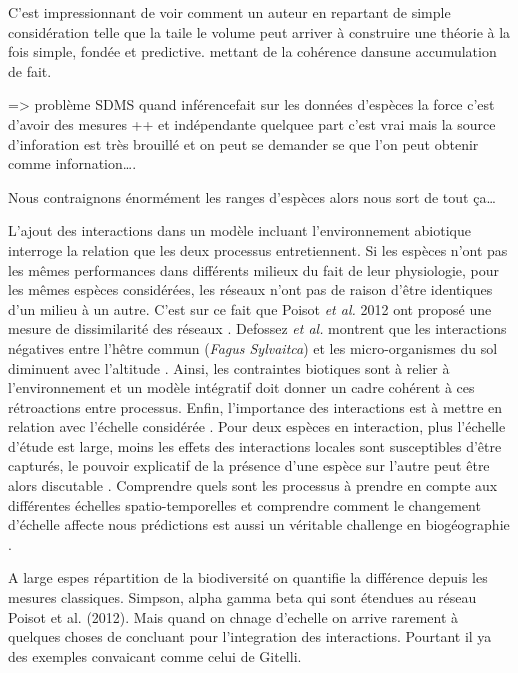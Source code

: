 C'est impressionnant de voir comment un auteur en repartant de simple
considération telle que la taile le volume peut arriver à construire une
théorie à la fois simple, fondée et predictive. mettant de la cohérence
dansune accumulation de fait.

=\textgreater{} problème SDMS quand inférencefait sur les données
d'espèces la force c'est d'avoir des mesures ++ et indépendante quelquee
part c'est vrai mais la source d'inforation est très brouillé et on peut
se demander se que l'on peut obtenir comme infornation\ldots{}.

Nous contraignons énormément les ranges d'espèces alors nous sort de
tout ça\ldots{}

L'ajout des interactions dans un modèle incluant l'environnement
abiotique interroge la relation que les deux processus entretiennent. Si
les espèces n'ont pas les mêmes performances dans différents milieux du
fait de leur physiologie, pour les mêmes espèces considérées, les
réseaux n'ont pas de raison d'être identiques d'un milieu à un autre.
C'est sur ce fait que Poisot \textit{et al.} 2012 ont proposé une mesure
de dissimilarité des réseaux \cite{Poisot2012}. Defossez \textit{et al.}
montrent que les interactions négatives entre l'hêtre commun
(\textit{Fagus Sylvaitca}) et les micro-organismes du sol diminuent avec
l'altitude \cite{Defossez2011}. Ainsi, les contraintes biotiques sont à
relier à l'environnement \cite{Brooker2006,Canham2006} et un modèle
intégratif doit donner un cadre cohérent à ces rétroactions entre
processus. Enfin, l'importance des interactions est à mettre en relation
avec l'échelle considérée \cite{Peterson2011}. Pour deux espèces en
interaction, plus l'échelle d'étude est large, moins les effets des
interactions locales sont susceptibles d'être capturés, le pouvoir
explicatif de la présence d'une espèce sur l'autre peut être alors
discutable \cite{Araujo2007}. Comprendre quels sont les processus à
prendre en compte aux différentes échelles spatio-temporelles et
comprendre comment le changement d'échelle affecte nous prédictions est
aussi un véritable challenge en biogéographie \cite{Martinez2012}.

A large espes répartition de la biodiversité on quantifie la différence
depuis les mesures classiques. Simpson, alpha gamma beta qui sont
étendues au réseau Poisot et al. (2012). Mais quand on chnage d'echelle
on arrive rarement à quelques choses de concluant pour l'integration des
interactions. Pourtant il ya des exemples convaicant comme celui de
Gitelli.

